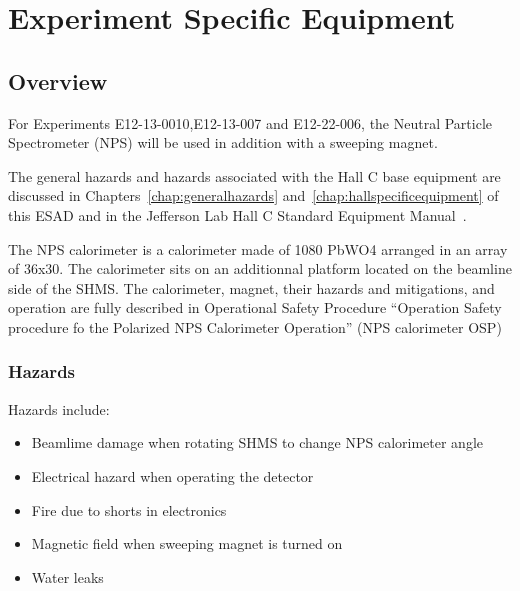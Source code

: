 %
%
\chapter{Experiment Specific Equipment}
\label{chap:expspecific}



\section{Overview}
For Experiments E12-13-0010,E12-13-007 and E12-22-006, the Neutral Particle Spectrometer (NPS) will be used in addition with a sweeping magnet.


The general hazards and hazards associated with the Hall C base
equipment are discussed in Chapters~\ref{chap:generalhazards}
and~\ref{chap:hallspecificequipment} of this ESAD and in the Jefferson
Lab Hall C Standard Equipment Manual~\cite{HallCosp}.

The NPS calorimeter is a calorimeter made of 1080 PbWO4 arranged in an array of 36x30. The calorimeter  
 sits on an additionnal platform located on the beamline side of the SHMS.
The calorimeter, magnet, their hazards and mitigations, and operation
are fully described in Operational Safety Procedure ``Operation Safety procedure fo the Polarized
NPS Calorimeter Operation'' (NPS calorimeter OSP)


\subsection{Hazards}
Hazards include:
\begin{itemize}
\item Beamlime damage when rotating SHMS to change NPS calorimeter angle
\item Electrical hazard when operating the detector
\item Fire due to shorts in electronics
\item Magnetic field when sweeping magnet is turned on
\item Water leaks
\end{itemize}

